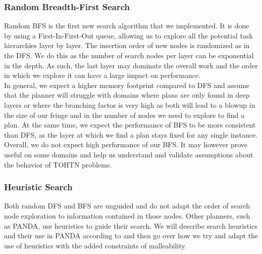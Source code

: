 \subsubsection{Random Breadth-First Search}
Random BFS is the first new search algorithm that we implemented. It is done by using a First-In-First-Out queue, allowing us to explore all the potential task hierarchies layer by layer. The insertion order of new nodes is randomized as in the DFS. We do this as the number of search nodes per layer can be exponential in the depth. As such, the last layer may dominate the overall work and the order in which we explore it can have a large impact on performance. \\
In general, we expect a higher memory footprint compared to DFS and assume that the planner will struggle with domains where plans are only found in deep layers or where the branching factor is very high as both will lead to a blowup in the size of our fringe and in the number of nodes we need to explore to find a plan. At the same time, we expect the performance of BFS to be more consistent than DFS, as the layer at which we find a plan stays fixed for any single instance. \\
Overall, we do not expect high performance of our BFS. It may however prove useful on some domains and help us understand and validate assumptions about the behavior of TOHTN problems.

\subsubsection{Heuristic Search}
Both random DFS and BFS are unguided and do not adapt the order of search node exploration to information contained in those nodes. Other planners, such as PANDA, use heuristics to guide their search. We will describe search heuristics and their use in PANDA according to \cite{holler2020htn} and then go over how we try and adapt the use of heuristics with the added constraints of malleability.

